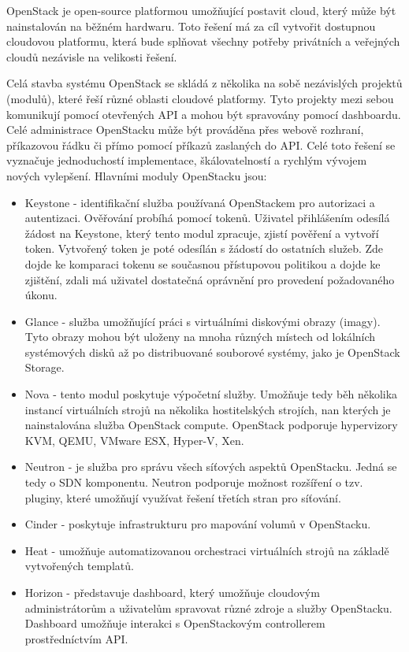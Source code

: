 OpenStack \cite{OpenStack_web} je open-source platformou umožňující postavit cloud, který může být nainstalován na běžném hardwaru. Toto řešení má za cíl vytvořit dostupnou cloudovou platformu, která bude splňovat všechny potřeby privátních a veřejných cloudů nezávisle na velikosti řešení.

Celá stavba systému OpenStack se skládá z několika na sobě nezávislých projektů (modulů), které řeší různé oblasti cloudové platformy. Tyto projekty mezi sebou komunikují pomocí otevřených API a mohou být spravovány pomocí dashboardu. Celé administrace OpenStacku může být prováděna přes webově rozhraní, příkazovou řádku či přímo pomocí příkazů zaslaných do API. Celé toto řešení se vyznačuje jednoduchostí implementace, škálovatelností a rychlým vývojem nových vylepšení. Hlavními moduly OpenStacku jsou:

\begin{itemize}
\item Keystone - identifikační služba používaná OpenStackem pro autorizaci a autentizaci. Ověřování probíhá pomocí tokenů. Uživatel přihlášením odesílá žádost na Keystone, který tento modul zpracuje, zjistí pověření a vytvoří token. Vytvořený token je poté odesílán s žádostí do ostatních služeb. Zde dojde ke komparaci tokenu se současnou přístupovou politikou a dojde ke zjištění, zdali má uživatel dostatečná oprávnění pro provedení požadovaného úkonu.
\item Glance - služba umožňující práci s virtuálními diskovými obrazy (imagy). Tyto obrazy mohou být uloženy na mnoha různých místech od lokálních systémových disků až po distribuované souborové systémy, jako je OpenStack Storage.
\item Nova - tento modul poskytuje výpočetní služby. Umožňuje tedy běh několika instancí virtuálních strojů na několika hostitelských strojích, nan kterých je nainstalována služba OpenStack compute. OpenStack podporuje hypervizory KVM, QEMU, VMware ESX, Hyper-V, Xen. 
\item Neutron - je služba pro správu všech síťových aspektů OpenStacku. Jedná se tedy o SDN komponentu. Neutron podporuje možnost rozšíření o tzv. pluginy, které umožňují využívat řešení třetích stran pro síťování.
\item Cinder - poskytuje infrastrukturu pro mapování volumů v OpenStacku.
\item Heat - umožňuje automatizovanou orchestraci virtuálních strojů na základě vytvořených templatů.
\item Horizon - představuje dashboard, který umožňuje cloudovým administrátorům a uživatelům spravovat různé zdroje a služby OpenStacku. Dashboard umožňuje interakci s OpenStackovým controllerem prostředníctvím API. 
\end{itemize}


